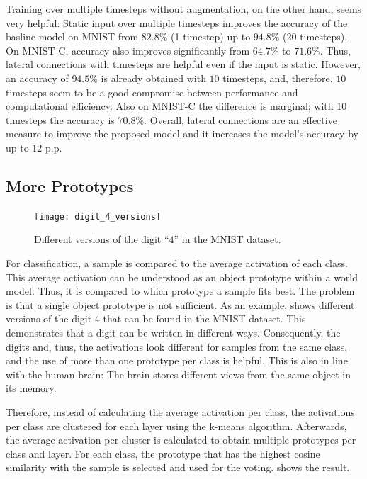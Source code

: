 Training over multiple timesteps without augmentation, on the other hand, seems very helpful: Static input over multiple timesteps improves the accuracy of the basline model on MNIST from $82.8\%$ (1 timestep) up to $94.8\%$ (20 timesteps). On MNIST-C, accuracy also improves significantly from $64.7\%$ to $71.6\%$.
 Thus, lateral connections with timesteps are helpful even if the input is static. However, an accuracy of $94.5\%$ is already obtained with $10$ timesteps, and, therefore, $10$ timesteps seem to be a good compromise between performance and computational efficiency. Also on MNIST-C the difference is marginal; with 10 timesteps the accuracy is $70.8\%$. Overall, lateral connections are an effective measure to improve the proposed model and it increases the model's accuracy by up to $12$ p.p.


\subsection{More Prototypes}
\begin{figure}[h]
    \centering
    \texttt{[image: digit\_4\_versions]}
    \caption[Different versions of the digit ``$4$'' in the MNIST dataset]{Different versions of the digit ``$4$'' in the MNIST dataset.}
\end{figure}

For classification, a sample is compared to the average activation of each class. This average activation can be understood as an object prototype within a world model. Thus, it is compared to which prototype a sample fits best. The problem is that a single object prototype is not sufficient. As an example,  shows different versions of the digit $4$ that can be found in the MNIST dataset. This demonstrates that a digit can be written in different ways.
Consequently, the digits and, thus, the activations look different for samples from the same class, and the use of more than one prototype per class is helpful. This is also in line with the human brain: The brain stores different views from the same object in its memory.

Therefore, instead of calculating the average activation per class, the activations per class are clustered for each layer using the k-means algorithm.
Afterwards, the average activation per cluster is calculated to obtain multiple prototypes per class and layer. For each class, the prototype that has the highest cosine similarity with the sample is selected and used for the voting.  shows the result.

